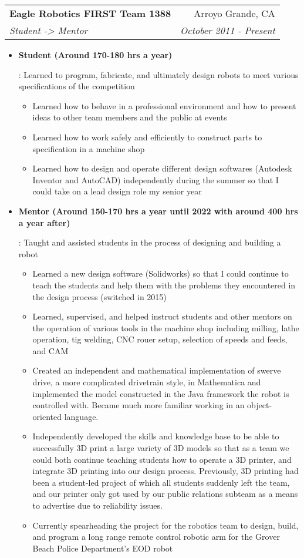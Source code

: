 \documentclass[letterpaper,10pt]{article}
\makeatletter
\newcommand{\resumeItem}[2]{
  \item\small{
    \textbf{#1}{: #2 \vspace{-2pt}}
  }
}
\newcommand{\resumeSubheading}[4]{
  \vspace{-1pt}\item[]
  \begin{tabular*}{0.98\textwidth}{l@{\extracolsep{\fill}}r}
      \hspace{-10pt}\textbf{#1} & #2 \\
      \hspace{-10pt}\textit{\small#3} & \textit{\small #4} \\
    \end{tabular*}\vspace{-5pt}
}
\newcommand{\resumeItemListStart}{\begin{itemize}}
\newcommand{\resumeItemListEnd}{\end{itemize}\vspace{-5pt}}
\makeatother
\begin{document}
    \resumeSubheading
      {Eagle Robotics FIRST Team 1388}{Arroyo Grande, CA}
      {Student -> Mentor}{October 2011 - Present}
      \resumeItemListStart
        \resumeItem{Student (Around 170-180 hrs a year)}
          {Learned to program, fabricate, and ultimately design robots to meet various specifications of the competition
          \begin{itemize}
              \item Learned how to behave in a professional environment and how to present ideas to other team members and the public at events
              \item Learned how to work safely and efficiently to construct parts to specification in a machine shop
              \item Learned how to design and operate different design softwares (Autodesk Inventor and AutoCAD) independently during the summer so that I could take on a lead design role my senior year
          \end{itemize}
          }
          \resumeItem{Mentor (Around 150-170 hrs a year until 2022 with around 400 hrs a year after)}
          {Taught and assisted students in the process of designing and building a robot
          \begin{itemize}
              \item Learned a new design software (Solidworks) so that I could continue to teach the students and help them with the problems they encountered in the design process (switched in 2015)
              \item Learned, supervised, and helped instruct students and other mentors on the operation of various tools in the machine shop including milling, lathe operation, tig welding, CNC rouer setup, selection of speeds and feeds, and CAM 
              \item Created an independent and mathematical implementation of swerve drive, a more complicated drivetrain style, in Mathematica and implemented the model constructed in the Java framework the robot is controlled with. Became much more familiar working in an object-oriented language.
	   \item Independently developed the skills and knowledge base to be able to successfully 3D print a large variety of 3D models so that as a team we could both continue teaching students how to operate a 3D printer, and integrate 3D printing into our design process. Previously, 3D printing had been a student-led project of which all students suddenly left the team, and our printer only got used by our public relations subteam as a means to advertise due to reliability issues.
	   \item Currently spearheading the project for the robotics team to design, build, and program a long range remote control robotic arm for the Grover Beach Police Department's EOD robot
          \end{itemize}
          }
      \resumeItemListEnd
\end{document}
